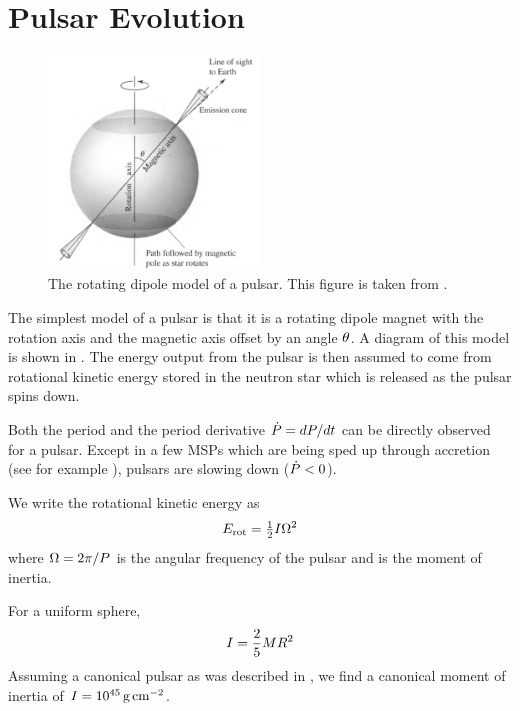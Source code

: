 \section{Pulsar Evolution}

\begin{figure}[htbp]
  \centering
    \includegraphics[width=0.5\textwidth]{chapters/pulsar_pwn_system/figures/pulsar_model.pdf}
    \caption{The rotating dipole model of a pulsar. This figure is taken
    from \citep{carroll_2006_introduction-modern}.}
\end{figure}

The simplest model of a pulsar is that it is a rotating dipole
magnet with the rotation axis and the magnetic axis offset by an
angle $\theta$.  A diagram of this model is shown
in .  The energy output from the pulsar is then
assumed to come from rotational kinetic energy stored in the neutron
star which is released as the pulsar spins down.

Both the period \period and the period derivative
$\dot{P}=dP/dt$ can be directly observed for a pulsar.
Except in a few \acp{MSP} which are being sped up through accretion
(see for example \cite{falanga_2005_integral-observations}), pulsars
are slowing down ($\dot{P}<0$).

We write the rotational kinetic energy as
\begin{equation}\eqnlabel{rotational_energy}
  \energyrotational = \tfrac{1}{2} I \PulsarAngularFrequency^2
\end{equation}
where $\Omega = 2\pi/P$ is the angular frequency
of the pulsar and \momentofinertia is the moment of inertia.

For a uniform sphere,
\begin{equation}
  I = \frac{2}{5} M R^2
\end{equation}
Assuming a canonical pulsar as was described in
, we find a canonical moment of inertia of
$I=10^{45}\,\text{g}\,\text{cm}^{-2}$.

